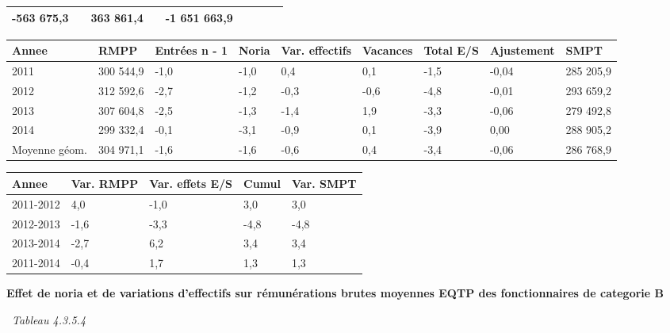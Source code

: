 \begin{longtable}[]{@{}lllllllll@{}}
\begin{minipage}[t]{0.16\columnwidth}
-563 675,3\strut
\end{minipage} & \begin{minipage}[t]{0.06\columnwidth}\raggedright
\strut
\end{minipage} & \begin{minipage}[t]{0.12\columnwidth}\raggedright
363 861,4\strut
\end{minipage} & \begin{minipage}[t]{0.06\columnwidth}\raggedright
\strut
\end{minipage} & \begin{minipage}[t]{0.10\columnwidth}\raggedright
-1 651 663,9\strut
\end{minipage} & \begin{minipage}[t]{0.06\columnwidth}\raggedright
\strut
\end{minipage}\tabularnewline
\bottomrule
\end{longtable}

\begin{longtable}[]{@{}lllllllll@{}}
\toprule
Annee & RMPP & Entrées n - 1 & Noria & Var. effectifs & Vacances & Total
E/S & Ajustement & SMPT\tabularnewline
\midrule
\endhead
2011 & 300 544,9 & -1,0 & -1,0 & 0,4 & 0,1 & -1,5 & -0,04 & 285
205,9\tabularnewline
2012 & 312 592,6 & -2,7 & -1,2 & -0,3 & -0,6 & -4,8 & -0,01 & 293
659,2\tabularnewline
2013 & 307 604,8 & -2,5 & -1,3 & -1,4 & 1,9 & -3,3 & -0,06 & 279
492,8\tabularnewline
2014 & 299 332,4 & -0,1 & -3,1 & -0,9 & 0,1 & -3,9 & 0,00 & 288
905,2\tabularnewline
Moyenne géom. & 304 971,1 & -1,6 & -1,6 & -0,6 & 0,4 & -3,4 & -0,06 &
286 768,9\tabularnewline
\bottomrule
\end{longtable}

\begin{longtable}[]{@{}lllll@{}}
\toprule
Annee & Var. RMPP & Var. effets E/S & Cumul & Var. SMPT\tabularnewline
\midrule
\endhead
2011-2012 & 4,0 & -1,0 & 3,0 & 3,0\tabularnewline
2012-2013 & -1,6 & -3,3 & -4,8 & -4,8\tabularnewline
2013-2014 & -2,7 & 6,2 & 3,4 & 3,4\tabularnewline
2011-2014 & -0,4 & 1,7 & 1,3 & 1,3\tabularnewline
\bottomrule
\end{longtable}

\textbf{Effet de noria et de variations d'effectifs sur rémunérations
brutes moyennes EQTP des fonctionnaires de categorie B}

~\emph{Tableau 4.3.5.4}

